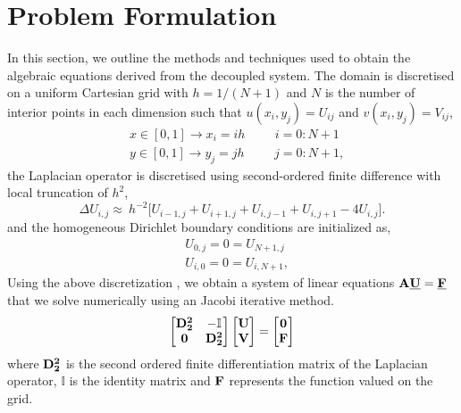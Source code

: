\section{Problem Formulation}
In this section, we outline the methods and techniques used to obtain the algebraic equations derived from the decoupled system.  The domain is discretised on a uniform Cartesian grid with $h = 1/(N+1)$ and $N$ is the number of interior points in each dimension such that $u(x_i,y_j) = U_{ij}$ and $v(x_i,y_j) = V_{ij}$,
\begin{align}
&x\in[0,1] \longrightarrow x_i = ih \hspace{1cm} i = 0:N+1\\
&y\in[0,1] \longrightarrow y_j = jh \hspace{1cm} j = 0:N+1,
\end{align}
the Laplacian operator is discretised using second-ordered finite difference with local truncation of $h^2$,
\begin{equation}
\Delta U_{i,j} \approx\ h^{-2}\Big[U_{i-1,j}+ U_{i+1,j}+ U_{i,j-1}+ U_{i,j+1}-4U_{i,j}\Big].
\end{equation}
and the homogeneous Dirichlet boundary conditions are initialized as,
\begin{equation}
\begin{split}
&U_{0,j} = 0 = U_{N+1,j} \\
&U_{i,0} = 0 = U_{i,N+1},
\end{split}
\end{equation}
Using the above discretization , we obtain a system of linear equations $\textbf{A}\textbf{\underline{U}} = \textbf{\underline{F}}$ that we solve numerically using an Jacobi iterative method.
\begin{align}
\begin{bmatrix}
    \bf{D}_2^2 & -\mathbb{I} \\
    \bf{0} & \bf{D}_2^2
\end{bmatrix}
\begin{bmatrix}
    \bf{U} \\
    \bf{V}
\end{bmatrix}
=
\begin{bmatrix}
    \bf{0}  \\
    \bf{F}
\end{bmatrix}
\end{align}
where $\bf{D}_2^2$ is the second ordered finite differentiation matrix of the Laplacian operator, $\mathbb{I}$ is the identity matrix and $\bf{F}$ represents the function valued on the grid.\\
